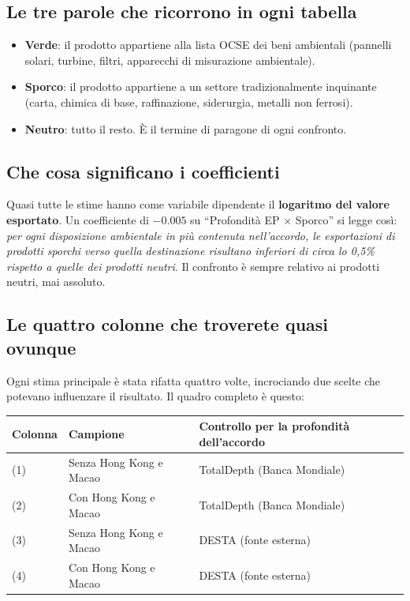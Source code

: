 \documentclass[11pt,a4paper]{article}
\begin{document}
\subsection*{Le tre parole che ricorrono in ogni tabella}

\begin{itemize}
\item \textbf{Verde}: il prodotto appartiene alla lista OCSE dei beni ambientali
      (pannelli solari, turbine, filtri, apparecchi di misurazione ambientale).
\item \textbf{Sporco}: il prodotto appartiene a un settore tradizionalmente
      inquinante (carta, chimica di base, raffinazione, siderurgia, metalli non ferrosi).
\item \textbf{Neutro}: tutto il resto. \`E il termine di paragone di ogni confronto.
\end{itemize}

\subsection*{Che cosa significano i coefficienti}

Quasi tutte le stime hanno come variabile dipendente il \textbf{logaritmo del valore
esportato}. Un coefficiente di $-0.005$ su ``Profondit\`a EP $\times$ Sporco'' si legge
cos\`i: \emph{per ogni disposizione ambientale in pi\`u contenuta nell'accordo, le
esportazioni di prodotti sporchi verso quella destinazione risultano inferiori di circa
lo 0,5\% rispetto a quelle dei prodotti neutri}. Il confronto \`e sempre relativo ai
prodotti neutri, mai assoluto.

\subsection*{Le quattro colonne che troverete quasi ovunque}

Ogni stima principale \`e stata rifatta quattro volte, incrociando due scelte che
potevano influenzare il risultato. Il quadro completo \`e questo:

\begin{center}
\small
\begin{tabular}{lll}
\toprule
Colonna & Campione & Controllo per la profondit\`a dell'accordo \\
\midrule
(1) & Senza Hong Kong e Macao & TotalDepth (Banca Mondiale) \\
(2) & Con Hong Kong e Macao & TotalDepth (Banca Mondiale) \\
(3) & Senza Hong Kong e Macao & DESTA (fonte esterna) \\
(4) & Con Hong Kong e Macao & DESTA (fonte esterna) \\
\bottomrule
\end{tabular}
\end{center}
\end{document}
